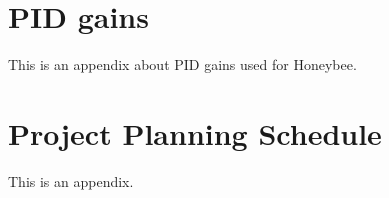 \chapter{PID gains}
\makeatletter{}\makeatother
\label{appen:pid_gains}

This is an appendix about PID gains used for Honeybee.

\chapter{Project Planning Schedule}
\makeatletter{}\makeatother
\label{appen:derivations_bigramseg}

This is an appendix.
